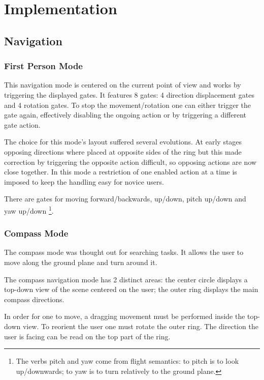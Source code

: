 \chapter{Implementation}



\section{Navigation}

\subsection{First Person Mode}

This navigation mode is centered on the current point of view and works by triggering the displayed gates.
It features 8 gates: 4 direction displacement gates and 4 rotation gates.
To stop the movement/rotation one can either trigger the gate again, effectively disabling the ongoing action
or by triggering a different gate action.

The choice for this mode's layout suffered several evolutions.
At early stages opposing directions where placed at opposite sides of the ring but this
made correction by triggering the opposite action difficult, so opposing actions are now close together.
In this mode a restriction of one enabled action at a time is imposed to keep the handling easy for novice users.

There are gates for moving forward/backwards, up/down, pitch up/down and yaw up/down
\footnote{The verbs pitch and yaw come from flight semantics: to pitch is to look up/downwards; to yaw is to turn relatively to the ground plane.}.



\subsection{Compass Mode}

The compass mode was thought out for searching tasks. It allows the user to move along the ground plane and turn around it.

The compass navigation mode has 2 distinct areas:
the center circle displays a top-down view of the scene centered on the user;
the outer ring displays the main compass directions.

In order for one to move, a dragging movement must be performed inside the top-down view.
To reorient the user one must rotate the outer ring. The direction the user is facing can be read on the top part of the ring.

